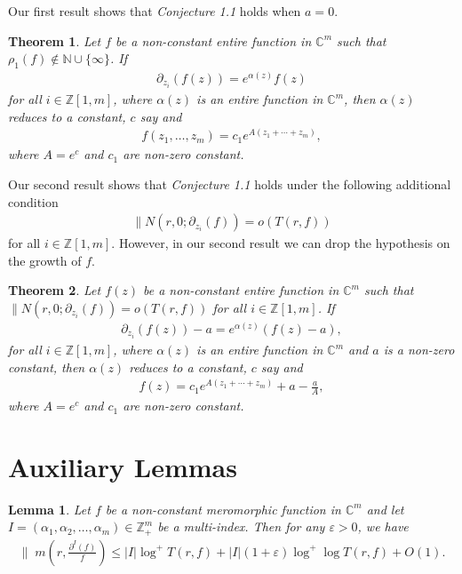 \documentclass[11pt, reqno]{amsart}
\newtheorem{theo}{Theorem}[section]
\newtheorem{lem}{Lemma}[section]
\numberwithin{equation}{section}
\begin{document}
Our first result shows that \emph{Conjecture 1.1} holds when $a=0$.
\begin{theo}\label{t3.1} Let $f$ be a non-constant entire function in $\mathbb{C}^m$ such that $\rho_1(f)\not\in\mathbb{N}\cup\{\infty\}$. If 
\begin{align*}
\partial_{z_i}(f(z))=e^{\alpha(z)}f(z)
\end{align*}
for all $i\in\mathbb{Z}[1,m]$, where $\alpha(z)$ is an entire function in $\mathbb{C}^m$, then $\alpha(z)$ reduces to a constant, $c$ say and 
\begin{align*}
f(z_1,\ldots,z_m)=c_1e^{A(z_1+ \cdots+z_m)},
\end{align*}
where $A=e^c$ and $c_1$ are non-zero constant.
\end{theo}

Our second result shows that \emph{Conjecture 1.1} holds under the following additional condition 
\begin{align*}
\parallel N(r,0;\partial_{z_i}(f))=o(T(r,f))
\end{align*}
for all $i\in\mathbb{Z}[1,m]$. However, in our second result we can drop the hypothesis on the growth of $f$.

\begin{theo}\label{t3.2} Let $f(z)$ be a non-constant entire function in $\mathbb{C}^m$ such that $\parallel N(r,0;\partial_{z_i}(f))=o(T(r,f))$ for all $i\in\mathbb{Z}[1,m]$. If 
\begin{align*}
\partial_{z_i}(f(z))-a=e^{\alpha(z)}(f(z)-a),
\end{align*}
for all $i\in\mathbb{Z}[1,m]$, where $\alpha(z)$ is an entire function in $\mathbb{C}^m$ and $a$ is a non-zero constant, then $\alpha(z)$ reduces to a constant, $c$ say and
\begin{align*}
f(z)=c_1e^{A(z_1+ \cdots+z_m)}+a-\frac{a}{A},
\end{align*}
where $A=e^c$ and $c_1$ are non-zero constant.
\end{theo}


\section{\bf{Auxiliary Lemmas}}
\begin{lem}\label{L.1}\cite[Lemma 1.37]{HLY} Let $f$ be a non-constant meromorphic function in $\mathbb{C}^m$ and let  $I=(\alpha_1,\alpha_2,\ldots,\alpha_m)\in \mathbb{Z}^m_+$ be a multi-index. Then for any $\varepsilon>0$, we have
\begin{align*}
\parallel\;m\left(r,\frac{\partial^I(f)}{f}\right)\leq |I|\log^+T(r,f)+|I|(1+\varepsilon)\log^+\log T(r,f)+O(1).
\end{align*}
\end{lem}
\end{document}
